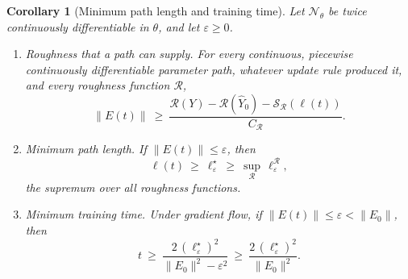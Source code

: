 \documentclass[11pt]{article}
\newtheorem{corollary}{Corollary}
\theoremstyle{definition}
\theoremstyle{remark}
\newcommand{\Net}{\mathcal{N}_\theta}    %
\newcommand{\Rgh}{\mathcal{R}}           %
\newcommand{\CR}{C_{\Rgh}}
\begin{document}
\begin{corollary}[Minimum path length and training time]\label{cor:mintime}
Let $\Net$ be twice continuously differentiable in $\theta$, and let $\varepsilon\ge0$.
\begin{enumerate}[label=(\alph*)]
\item \emph{Roughness that a path can supply.} For every continuous, piecewise continuously differentiable parameter path, whatever update rule produced it, and every roughness function $\Rgh$,
\begin{equation}\label{eq:supplybound}
\|E(t)\|\ \ge\ \frac{\Rgh(Y) - \Rgh(\hat Y_0) - \mathcal{S}_\Rgh(\ell(t))}{\CR}.
\end{equation}
\item \emph{Minimum path length.} If $\|E(t)\|\le\varepsilon$, then
\begin{equation}\label{eq:minpath}
\ell(t)\ \ge\ \ell_\varepsilon^\star\ \ge\ \sup_\Rgh\,\ell_\varepsilon^\Rgh ,
\end{equation}
the supremum over all roughness functions.
\item \emph{Minimum training time.} Under gradient flow, if $\|E(t)\|\le\varepsilon<\|E_0\|$, then
\begin{equation}\label{eq:mintime}
t\ \ge\ \frac{2\,(\ell_\varepsilon^\star)^2}{\|E_0\|^2 - \varepsilon^2}\ \ge\ \frac{2\,(\ell_\varepsilon^\star)^2}{\|E_0\|^2} .
\end{equation}
\end{enumerate}
\end{corollary}
\end{document}
